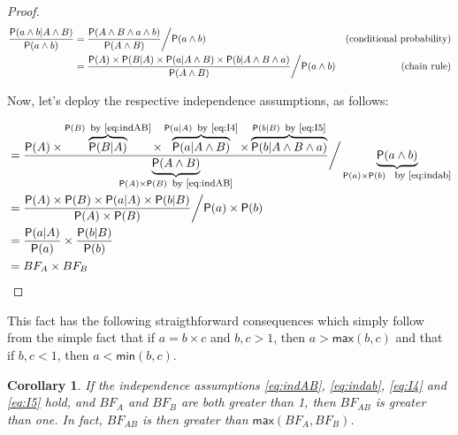 \documentclass[
  10pt,
  dvipsnames,enabledeprecatedfontcommands]{scrartcl}
\newcommand{\et}{\wedge}
\newcommand{\pr}[1]{\ensuremath{\mathsf{P}(#1)}}
\newtheorem{corollary}{Corollary}[fact]
\begin{document}
\begin{proof}

\begin{align*}
\frac{\pr{a \wedge b\vert A\wedge B}}{\pr{a \wedge b}} & = \frac{\pr{A \et B\et a\wedge b}}{\pr{A \et B}} \bigg/ \pr{a \wedge b}
&\mbox{(conditional probability)} \\
&  = \frac{\pr{A} \times \pr {B \vert A}  \times \pr{a \vert A \et B} \times \pr{b \vert A \et B \et a}}{\pr{A \et B}} \bigg/ \pr{a \wedge b}
&\mbox{\,\,\,\,\,\,\, (chain rule)} \\
\end{align*}

\noindent Now, let's deploy the respective independence assumptions, as follows:

\begin{align*}
&  = \frac{\pr{A} \times \overbrace{\pr {B \vert A}}^{ \pr{B} \mbox{\footnotesize \, by \eqref{eq:indAB}}}  \times
\overbrace{\pr{a \vert A \et B}}^{\pr{a \vert A} \mbox{\footnotesize \, by \eqref{eq:I4}}}
\times \overbrace{\pr{b \vert A \et B \et a}}^{\pr{b \vert B} \mbox{\footnotesize \, by \eqref{eq:I5}}}
}{\underbrace{\pr{A \et B}}_{\pr{A} \times \pr{B} \mbox{\footnotesize \, by \eqref{eq:indAB}}}} \bigg/ \underbrace{\pr{a \wedge b}}_{\pr{a}\times \pr{b} \mbox{ \footnotesize \, by \eqref{eq:indab}}} \\
&  = \frac{\pr{A} \times  \pr{B}   \times \pr{a \vert A}  \times  \pr{b \vert B}}
{\pr{A} \times \pr{B}} \bigg/ \pr{a}\times \pr{b} \\
& = \frac{\pr{a \vert A}  }{\pr{a}}  \times \frac{\pr{b \vert B}}{\pr{b}} \\
& = BF_{A} \times BF_B
\end{align*}

\end{proof}

This fact has the following straigthforward consequences which simply
follow from the simple fact that if \(a = b \times c\) and \(b, c>1\),
then \(a > \mathsf{max}(b,c)\) and that if \(b, c<1\), then
\(a < \mathsf{min}(b,c)\).

\begin{corollary} If the independence assumptions \eqref{eq:indAB}, \eqref{eq:indab}, \eqref{eq:I4} and \eqref{eq:I5} hold, and $BF_{A}$ and $BF_{B}$ are both greater than 1, then $BF_{AB}$ is greater than one. In fact,  $BF_{AB}$ is then greater than  $\mathsf{max}(BF_{A},BF_{B})$. \label{cor:BFind2}
\end{corollary}
\end{document}
